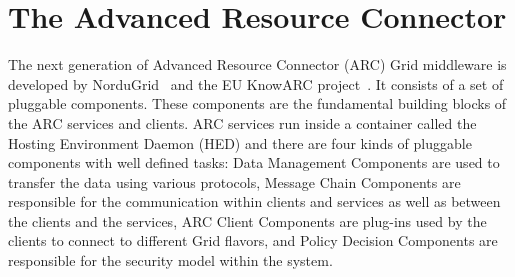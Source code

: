 \documentclass{llncs}
\begin{document}







\section{The Advanced Resource Connector}
\label{The Advance Resource Connector}

The next generation of Advanced Resource Connector (ARC) Grid middleware is
developed by NorduGrid~\cite{NorduGridsite} and the EU KnowARC
 project~\cite{KnowARCsite}. It consists of a set of pluggable 
components. These components are the
fundamental building blocks of the ARC services and clients. ARC
services run inside a container called the Hosting Environment
Daemon (HED) and there are four kinds of pluggable components with well
defined tasks: Data Management Components are used to transfer the
data using various protocols, Message Chain Components are
responsible for the communication within clients and services as well as
between the clients and the services, ARC Client Components are
plug-ins used by the clients to connect to different Grid flavors, and
Policy Decision Components are responsible for the security model
within the system.

\end{document}
